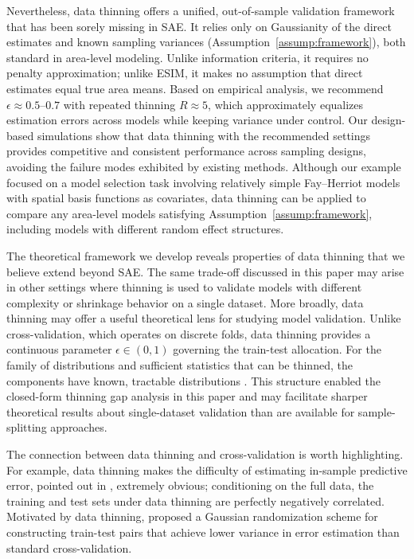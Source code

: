 \documentclass[11pt]{article}
\theoremstyle{plain}
\theoremstyle{definition}
\theoremstyle{remark}
\begin{document}
Nevertheless, data thinning offers a unified, out-of-sample validation framework that has been sorely missing in SAE. It relies only on Gaussianity of the direct estimates and known sampling variances (Assumption~\ref{assump:framework}), both standard in area-level modeling. Unlike information criteria, it requires no penalty approximation; unlike ESIM, it makes no assumption that direct estimates equal true area means. Based on empirical analysis, we recommend $\epsilon \approx 0.5$--$0.7$ with repeated thinning $R\approx 5$, which approximately equalizes estimation errors across models while keeping variance under control. Our design-based simulations show that data thinning with the recommended settings provides competitive and consistent performance across sampling designs, avoiding the failure modes exhibited by existing methods. Although our example focused on a model selection task involving relatively simple Fay--Herriot models with spatial basis functions as covariates, data thinning can be applied to compare any area-level models satisfying Assumption~\ref{assump:framework}, including models with different random effect structures.

The theoretical framework we develop reveals properties of data thinning that we believe extend beyond SAE. The same trade-off discussed in this paper may arise in other settings where thinning is used to validate models with different complexity or shrinkage behavior on a single dataset.  More broadly, data thinning may offer a useful theoretical lens for studying model validation. Unlike cross-validation, which operates on discrete folds, data thinning provides a continuous parameter $\epsilon \in (0,1)$ governing the train-test allocation. For the family of distributions and sufficient statistics that can be thinned, the components have known, tractable distributions \citep{dharamshi_generalized_2025}. This structure enabled the closed-form thinning gap analysis in this paper and may facilitate sharper theoretical results about single-dataset validation than are available for sample-splitting approaches.

The connection between data thinning and cross-validation is worth highlighting. For example, data thinning makes the difficulty of estimating in-sample predictive error, pointed out in \citet{bates_cross-validation_2024}, extremely obvious; conditioning on the full data, the training and test sets under data thinning are perfectly negatively correlated. Motivated by data thinning, \citet{liu_cross-validation_2026} proposed a Gaussian randomization scheme for constructing train-test pairs that achieve lower variance in error estimation than standard cross-validation.
\end{document}
